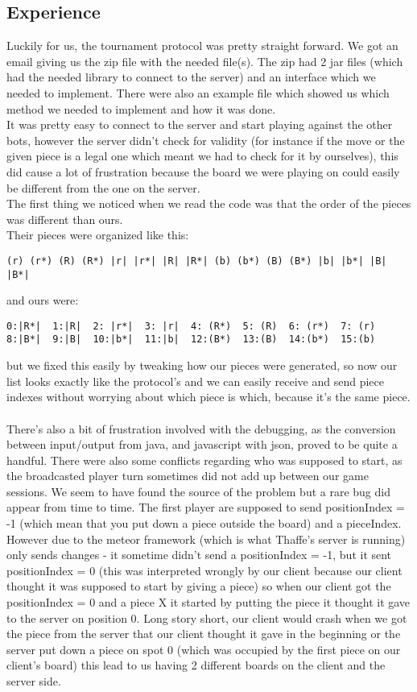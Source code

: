 \documentclass[12pt, a4paper]{article}
\begin{document}
\subsection{Experience}
Luckily for us, the tournament protocol was pretty straight forward. We got an email giving us the zip file with the needed file(s). The zip had 2 jar files (which had the needed library to connect to the server) and an interface which we needed to implement. There were also an example file which showed us which method we needed to implement and how it was done. \\
It was pretty easy to connect to the server and start playing against the other bots, however the server didn't check for validity (for instance if the move or the given piece is a legal one which meant we had to check for it by ourselves), this did cause a lot of frustration because the board we were playing on could easily be different from the one on the server. \\
The first thing we noticed when we read the code was that the order of the pieces was different than ours.\\
Their pieces were organized like this:
\begin{verbatim}
(r) (r*) (R) (R*) |r| |r*| |R| |R*| (b) (b*) (B) (B*) |b| |b*| |B| |B*|
\end{verbatim}
and ours were:
\begin{verbatim}
0:|R*|  1:|R|  2: |r*|  3: |r|  4: (R*)  5: (R)  6: (r*)  7: (r)
8:|B*|  9:|B|  10:|b*|  11:|b|  12:(B*)  13:(B)  14:(b*)  15:(b)
\end{verbatim}
but we fixed this easily by tweaking how our pieces were generated, so now our list looks exactly like the protocol's and we can easily receive and send piece indexes without worrying about which piece is which, because it's the same piece.\\ \\
There's also a bit of frustration involved with the debugging, as the conversion between input/output from java, and javascript with json, proved to be quite a handful. There were also some conflicts regarding who was supposed to start, as the broadcasted player turn sometimes did not add up between our game sessions. We seem to have found the source of the problem but a rare bug did appear from time to time. The first player are supposed to send positionIndex = -1 (which mean that you put down a piece outside the board) and a pieceIndex. However due to the meteor framework (which is what Thaffe's server is running) only sends changes - it sometime didn't send a positionIndex = -1, but it sent positionIndex = 0 (this was interpreted wrongly by our client because our client thought it was supposed to start by giving a piece) so when our client got the positionIndex = 0 and a piece X it started by putting the piece it thought it gave to the server on position 0. Long story short, our client would crash when we got the piece from the server that our client thought it gave in the beginning or the server put down a piece on spot 0 (which was occupied by the first piece on our client's board) this lead to us having 2 different boards on the client and the server side.\\ 
\end{document}
